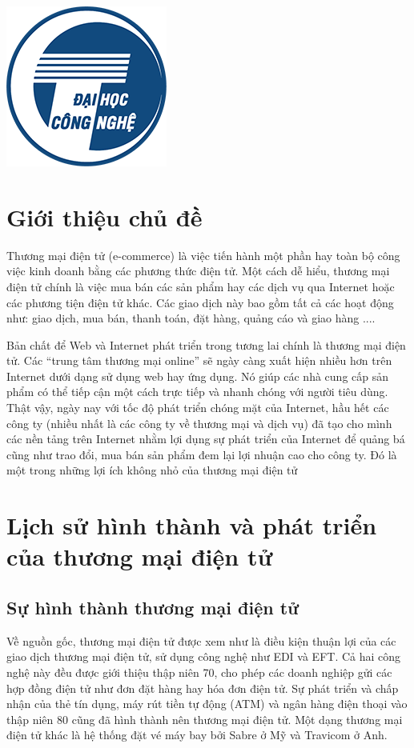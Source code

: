 \documentclass[12pt]{article}
\begin{document}
\begin{titlepage}
\includegraphics[scale=0.36]{logo/UET.png}\\[2cm]
 

\vfill

\end{titlepage}

\newpage
\tableofcontents

\section{Giới thiệu chủ đề}
Thương mại điện tử (e-commerce) là việc tiến hành một phần hay toàn bộ công việc kinh doanh bằng các phương thức điện tử. Một cách dễ hiểu, thương mại điện tử chính là việc mua bán các sản phẩm hay các dịch vụ qua Internet hoặc các phương tiện điện tử khác. Các giao dịch này bao gồm tất cả các hoạt động như: giao dịch, mua bán, thanh toán, đặt hàng, quảng cáo và giao hàng ....


Bản chất để Web và Internet phát triển trong tương lai chính là thương mại điện tử. Các “trung tâm thương mại online” sẽ ngày càng xuất hiện nhiều hơn trên Internet dưới dạng sử dụng web hay ứng dụng. Nó giúp các nhà cung cấp sản phẩm có thể tiếp cận một cách trực tiếp và nhanh chóng với người tiêu dùng. Thật vậy, ngày nay với tốc độ phát triển chóng mặt của Internet, hầu hết các công ty (nhiều nhất là các công ty về thương mại và dịch vụ) đã tạo cho mình các nền tảng trên Internet nhằm lợi dụng sự phát triển của Internet để quảng bá cũng như trao đổi, mua bán sản phẩm đem lại lợi nhuận cao cho công ty. Đó là một trong những lợi ích không nhỏ của thương mại điện tử

\section{Lịch sử hình thành và phát triển của thương mại điện tử }
\subsection{Sự hình thành thương mại điện tử}
Về nguồn gốc, thương mại điện tử được xem như là điều kiện thuận lợi của các giao dịch thương mại điện tử, sử dụng công nghệ như EDI và EFT. Cả hai công nghệ này đều được giới thiệu thập niên 70, cho phép các doanh nghiệp gửi các hợp đồng điện tử như đơn đặt hàng hay hóa đơn điện tử. Sự phát triển và chấp nhận của thẻ tín dụng, máy rút tiền tự động (ATM) và ngân hàng điện thoại vào thập niên 80 cũng đã hình thành nên thương mại điện tử. Một dạng thương mại điện tử khác là hệ thống đặt vé máy bay bởi Sabre ở Mỹ và Travicom ở Anh.
\end{document}
